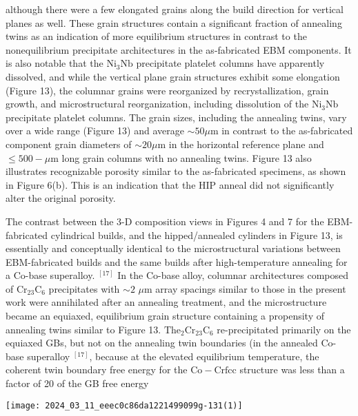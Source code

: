 \documentclass[10pt]{article}
\begin{document}
although there were a few elongated grains along the build direction for vertical planes as well. These grain structures contain a significant fraction of annealing twins as an indication of more equilibrium structures in contrast to the nonequilibrium precipitate architectures in the as-fabricated EBM components. It is also notable that the $\mathrm{Ni}_{3} \mathrm{Nb}$ precipitate platelet columns have apparently dissolved, and while the vertical plane grain structures exhibit some elongation (Figure 13), the columnar grains were reorganized by recrystallization, grain growth, and microstructural reorganization, including dissolution of the $\mathrm{Ni}_{3} \mathrm{Nb}$ precipitate platelet columns. The grain sizes, including the annealing twins, vary over a wide range (Figure 13) and average $\sim 50 \mu \mathrm{m}$ in contrast to the as-fabricated component grain diameters of $\sim 20 \mu \mathrm{m}$ in the horizontal reference plane and $\leq 500-\mu \mathrm{m}$ long grain columns with no annealing twins. Figure 13 also illustrates recognizable porosity similar to the as-fabricated specimens, as shown in Figure 6(b). This is an indication that the HIP anneal did not significantly alter the original porosity.

The contrast between the 3-D composition views in Figures 4 and 7 for the EBM-fabricated cylindrical builds, and the hipped/annealed cylinders in Figure 13, is essentially and conceptually identical to the microstructural variations between EBM-fabricated builds and the same builds after high-temperature annealing for a Co-base superalloy. ${ }^{[17]}$ In the Co-base alloy, columnar architectures composed of $\mathrm{Cr}_{23} \mathrm{C}_{6}$ precipitates with $\sim 2$ $\mu \mathrm{m}$ array spacings similar to those in the present work were annihilated after an annealing treatment, and the microstructure became an equiaxed, equilibrium grain structure containing a propensity of annealing twins similar to Figure 13. $\mathrm{The}_{2} \mathrm{Cr}_{23} \mathrm{C}_{6}$ re-precipitated primarily on the equiaxed GBs, but not on the annealing twin boundaries (in the annealed Co-base superalloy ${ }^{[17]}$, because at the elevated equilibrium temperature, the coherent twin boundary free energy for the $\mathrm{Co}-\mathrm{Cr} \mathrm{fcc}$ structure was less than a factor of 20 of the GB free energy

\begin{center}
\texttt{[image: 2024\_03\_11\_eeec0c86da1221499099g-131(1)]}
\end{center}
\end{document}
